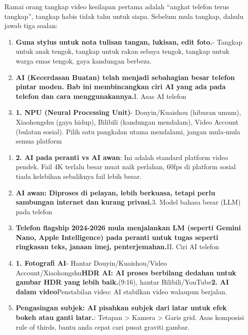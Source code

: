 


Ramai orang tangkap video kesilapan pertama adalah “angkat telefon terus tangkap”, tangkap habis tidak tahu untuk siapa. Sebelum mula tangkap, dahulu jawab tiga soalan:

\begin{enumerate}
  \item \textbf{Guna stylus untuk nota tulisan tangan, lukisan, edit foto.}- Tangkap untuk anak tengok, tangkap untuk rakan sebaya tengok, tangkap untuk warga emas tengok, gaya kandungan berbeza.
  \item \textbf{AI (Kecerdasan Buatan) telah menjadi sebahagian besar telefon pintar moden. Bab ini membincangkan ciri AI yang ada pada telefon dan cara menggunakannya.}I. Asas AI telefon
  \item \textbf{1. NPU (Neural Processing Unit)}- Douyin/Kuaishou (hiburan umum), Xiaohongshu (gaya hidup), Bilibili (kandungan mendalam), Video Account (bulatan sosial). Pilih satu pangkalan utama mendalami, jangan mula-mula semua platform
\end{enumerate}


\begin{enumerate}
  \item \textbf{2. AI pada peranti vs AI awan}: Ini adalah standard platform video pendek. Fail 4K terlalu besar muat naik perlahan, 60fps di platform sosial tiada kelebihan sebaliknya fail lebih besar.
  \item \textbf{AI awan: Diproses di pelayan, lebih berkuasa, tetapi perlu sambungan internet dan kurang privasi.}3. Model bahasa besar (LLM) pada telefon
  \item \textbf{Telefon flagship 2024-2026 mula menjalankan LM (seperti Gemini Nano, Apple Intelligence) pada peranti untuk tugas seperti ringkasan teks, janaan imej, penterjemahan.}II. Ciri AI telefon
  \item \textbf{1. Fotografi AI}- Hantar Douyin/Kuaishou/Video Account/Xiaohongshu\textbf{HDR AI: AI proses berbilang dedahan untuk gambar HDR yang lebih baik.}(9:16), hantar Bilibili/YouTube\textbf{2. AI dalam video}Penstabilan video: AI stabilkan video walaupun berjalan.
  \item \textbf{Pengasingan subjek: AI pisahkan subjek dari latar untuk efek bokeh atau ganti latar.}: Tetapan > Kamera > Garis grid. Asas komposisi rule of thirds, bantu anda cepat cari pusat graviti gambar.
\end{enumerate}

